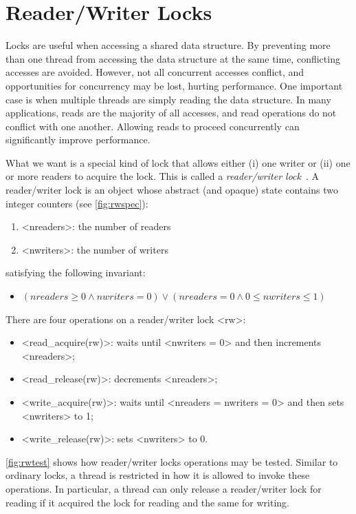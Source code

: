 \documentclass{report}
\begin{document}
\section{Reader/Writer Locks}
%
%

Locks are useful when accessing a shared data structure.  By preventing
more than one thread from accessing the data structure at the same
time, conflicting accesses are avoided.  However, not all concurrent
accesses conflict, and opportunities for concurrency may be lost,
hurting performance.  One important case is when multiple threads
are simply reading the data structure.
In many applications, reads are the majority of all accesses,
and read operations do not conflict with one another.
Allowing reads to proceed concurrently can significantly improve performance.

What we want is a special kind of lock that allows either (i) one writer
or (ii) one or more readers to acquire the lock.  This is called
a \emph{reader/writer lock}~\cite{CHP71}.
%
A reader/writer lock is an object whose abstract (and opaque)
state contains two integer counters (see \autoref{fig:rwspec}):
\begin{enumerate}
\item <{nreaders}>: the number of readers
\item <{nwriters}>: the number of writers
\end{enumerate}
satisfying the following invariant:
\begin{itemize}
\item [] $(\mathit{nreaders} \ge 0 \land \mathit{nwriters} = 0) \lor
    (\mathit{nreaders} = 0 \land 0 \le \mathit{nwriters} \le 1)$
\end{itemize}

There are four operations on a reader/writer lock <{rw}>:
\begin{itemize}
\item <{read_acquire(rw)}>: waits until <{nwriters = 0}>
and then increments <{nreaders}>;
\item <{read_release(rw)}>: decrements <{nreaders}>;
\item <{write_acquire(rw)}>: waits until <{nreaders = nwriters = 0}>
and then sets <{nwriters}> to 1;
\item <{write_release(rw)}>: sets <{nwriters}> to 0.
\end{itemize}

\autoref{fig:rwtest} shows how reader/writer locks operations
may be tested.
Similar to ordinary locks, a thread is restricted in how it is allowed to
invoke these operations.
In particular, a thread can only release a reader/writer lock for reading
if it acquired the lock for reading and the same for writing.
\end{document}
